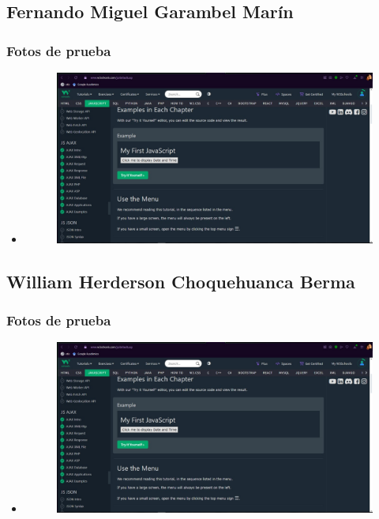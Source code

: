 \documentclass{article}
\begin{document}
	\subsection{Fernando Miguel Garambel Marín}
	\subsubsection{Fotos de prueba}
	\begin{itemize}
		\item \begin{figure}[H]
			\centering
			\includegraphics[width=1.0\textwidth,keepaspectratio]{img/wsLuis.jpg}
		\end{figure}
	\end{itemize}
	\subsection{William Herderson Choquehuanca Berma}
	\subsubsection{Fotos de prueba}
	\begin{itemize}
		\item \begin{figure}[H]
			\centering
			\includegraphics[width=1.0\textwidth,keepaspectratio]{img/wsLuis.jpg}
		\end{figure}
	\end{itemize}
\end{document}
